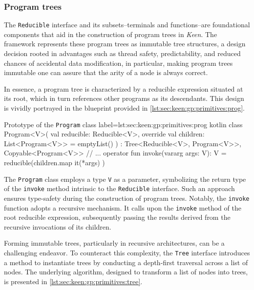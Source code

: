 
\subsubsection{Program trees}
  The \texttt{Reducible} interface and its subsets--terminals and 
  functions--are foundational components that aid in the construction of 
  program trees in \textit{Keen}. The framework represents these program 
  trees as immutable tree structures, a design decision rooted in advantages 
  such as thread safety, predictability, and reduced chances of accidental 
  data modification, in particular, making program trees immutable one can 
  assure that the arity of a node is always correct.

  In essence, a program tree is characterized by a reducible expression 
  situated at its root, which in turn references other programs as its 
  descendants. This design is vividly portrayed in the blueprint provided in 
  \vref{lst:sec:keen:gp:primitives:prog}.

  \begin{code}{Prototype of the \texttt{Program} class}{
    label=lst:sec:keen:gp:primitives:prog
  }{kotlin}
    class Program<V>(
      val reducible: Reducible<V>,
      override val children: List<Program<V>> = emptyList()
    ) : Tree<Reducible<V>, Program<V>>, Copyable<Program<V>> {
      // ...
      operator fun invoke(vararg args: V): V = reducible(children.map { it(*args) })
    }
  \end{code}

  The \texttt{Program} class employs a type \texttt{V} as a parameter, 
  symbolizing the return type of the \texttt{invoke} method intrinsic to the 
  \texttt{Reducible} interface. Such an approach ensures type-safety during the 
  construction of program trees. Notably, the \texttt{invoke} function adopts a 
  recursive mechanism. It calls upon the \texttt{invoke} method of the root 
  reducible expression, subsequently passing the results derived from the 
  recursive invocations of its children.

  Forming immutable trees, particularly in recursive architectures, can be a 
  challenging endeavor. To counteract this complexity, the \texttt{Tree} 
  interface introduces a method to instantiate trees by conducting a depth-first 
  traversal across a list of nodes. The underlying algorithm, designed to 
  transform a list of nodes into trees, is presented in 
  \vref{lst:sec:keen:gp:primitives:tree}.


